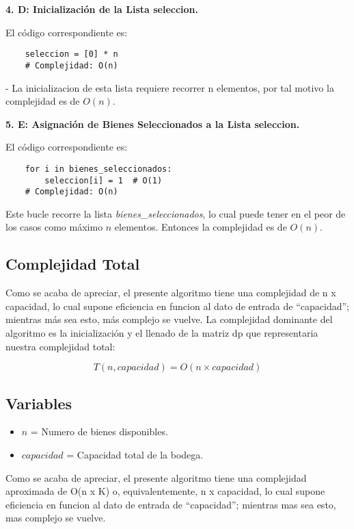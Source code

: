 \textbf{4. D: Inicialización de la Lista seleccion.}

El código correspondiente es:
\begin{lstlisting}
	seleccion = [0] * n
	# Complejidad: O(n)
\end{lstlisting}
- La inicializacion de esta lista requiere recorrer n elementos, por tal motivo la complejidad es de \( O(n) \).

\textbf{5. E: Asignación de Bienes Seleccionados a la Lista seleccion.}

El código correspondiente es:
\begin{lstlisting}
	for i in bienes_seleccionados:
		seleccion[i] = 1  # O(1)
	# Complejidad: O(n)
\end{lstlisting}
Este bucle recorre la lista \textit{bienes\_seleccionados}, lo cual puede tener en el peor de los casos como máximo \( n \) elementos. Entonces la complejidad es de \( O(n) \).

\subsection*{Complejidad Total}

Como se acaba de apreciar, el presente algoritmo tiene una complejidad de n x capacidad, lo cual supone eficiencia en funcion al dato de entrada de “capacidad”; mientras más sea esto, más complejo se vuelve.
La complejidad dominante del algoritmo es la inicialización y el llenado de la matriz dp que representaria nuestra complejidad total:

\[
T(n, capacidad) = O(n \times capacidad)
\]

\subsection*{Variables}

\begin{itemize}
	\item \( n \) = Numero de bienes disponibles.
	\item \( capacidad \) = Capacidad total de la bodega.
\end{itemize}




Como se acaba de apreciar, el presente algoritmo tiene una complejidad aproximada de O(n x K) o, equivalentemente, n x capacidad, lo cual supone eficiencia en funcion al dato de entrada de “capacidad”; mientras mas sea esto, mas complejo se vuelve.
